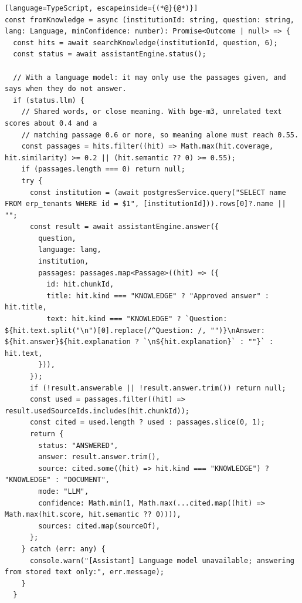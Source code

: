 \begin{lstlisting}[language=TypeScript, escapeinside={(*@}{@*)}]
const fromKnowledge = async (institutionId: string, question: string, lang: Language, minConfidence: number): Promise<Outcome | null> => {
  const hits = await searchKnowledge(institutionId, question, 6);
  const status = await assistantEngine.status();

  // With a language model: it may only use the passages given, and says when they do not answer.
  if (status.llm) {
    // Shared words, or close meaning. With bge-m3, unrelated text scores about 0.4 and a
    // matching passage 0.6 or more, so meaning alone must reach 0.55.
    const passages = hits.filter((hit) => Math.max(hit.coverage, hit.similarity) >= 0.2 || (hit.semantic ?? 0) >= 0.55);
    if (passages.length === 0) return null;
    try {
      const institution = (await postgresService.query("SELECT name FROM erp_tenants WHERE id = $1", [institutionId])).rows[0]?.name || "";
      const result = await assistantEngine.answer({
        question,
        language: lang,
        institution,
        passages: passages.map<Passage>((hit) => ({
          id: hit.chunkId,
          title: hit.kind === "KNOWLEDGE" ? "Approved answer" : hit.title,
          text: hit.kind === "KNOWLEDGE" ? `Question: ${hit.text.split("\n")[0].replace(/^Question: /, "")}\nAnswer: ${hit.answer}${hit.explanation ? `\n${hit.explanation}` : ""}` : hit.text,
        })),
      });
      if (!result.answerable || !result.answer.trim()) return null;
      const used = passages.filter((hit) => result.usedSourceIds.includes(hit.chunkId));
      const cited = used.length ? used : passages.slice(0, 1);
      return {
        status: "ANSWERED",
        answer: result.answer.trim(),
        source: cited.some((hit) => hit.kind === "KNOWLEDGE") ? "KNOWLEDGE" : "DOCUMENT",
        mode: "LLM",
        confidence: Math.min(1, Math.max(...cited.map((hit) => Math.max(hit.score, hit.semantic ?? 0)))),
        sources: cited.map(sourceOf),
      };
    } catch (err: any) {
      console.warn("[Assistant] Language model unavailable; answering from stored text only:", err.message);
    }
  }


\end{lstlisting}
